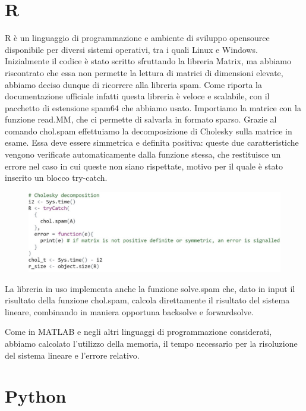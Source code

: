 \documentclass[a4paper,10pt]{article}
\begin{document}
\newpage

\section{R}

R è un linguaggio di programmazione e ambiente di sviluppo opensource disponibile per diversi sistemi operativi, tra i quali Linux e Windows.
Inizialmente il codice è stato scritto sfruttando la libreria Matrix, ma abbiamo riscontrato che essa non permette la lettura di matrici di dimensioni elevate, abbiamo deciso dunque di ricorrere alla libreria spam. Come riporta la documentazione ufficiale infatti questa libreria è veloce e scalabile, con il pacchetto di estensione spam64 che abbiamo usato.
Importiamo la matrice con la funzione read.MM, che ci permette di salvarla in formato sparso.
Grazie al comando chol.spam effettuiamo la decomposizione di Cholesky sulla matrice in esame. Essa deve essere simmetrica e definita positiva: queste due caratteristiche vengono verificate automaticamente dalla funzione stessa, che restituisce un errore nel caso in cui queste non siano rispettate, motivo per il quale è stato inserito un blocco try-catch.

\begin{figure}[H]
\centering
\includegraphics[width=0.8\linewidth]{img/R1.jpg}
\end{figure}

La libreria in uso implementa anche la funzione solve.spam che, dato in input il risultato della funzione chol.spam, calcola direttamente il risultato del sistema lineare, combinando in maniera opportuna backsolve e forwardsolve. 

Come in MATLAB e negli altri linguaggi di programmazione considerati, abbiamo calcolato l’utilizzo della memoria, il tempo necessario per la risoluzione del sistema lineare e l’errore relativo. 

\newpage

\section{Python}
\end{document}
